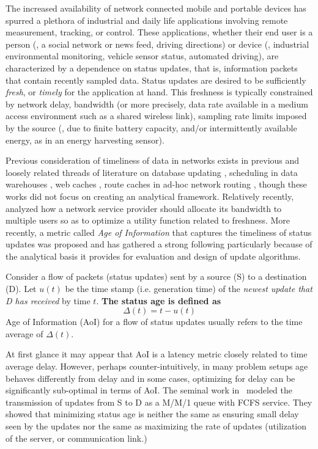 

The increased availability of network connected mobile and portable devices has spurred a plethora of industrial and daily life applications involving remote measurement, tracking, or control. These applications, whether their end user is a person (\eg, a social network or news feed, driving directions) or device (\eg, industrial environmental monitoring, vehicle sensor status, automated driving), are characterized by a dependence on status updates, that is, information packets that contain recently sampled data. Status updates are desired to be sufficiently \emph{fresh}, or \emph{timely} for the application at hand. This freshness is typically constrained by network delay, bandwidth (or more precisely, data rate available in a medium access environment such as a shared wireless link), sampling rate limits imposed by the source (\eg, due to finite battery capacity, and/or intermittently available energy, as in an energy harvesting sensor).

Previous consideration of timeliness of data in networks exists in previous and loosely related threads of literature on database updating \cite{Xiong99, adelberg1995applying, cho2000synchronizing}, scheduling in data warehouses \cite{golab2009scheduling}, web caches \cite{Shenker99}, route caches in ad-hoc network routing \cite{Johnson2002}, though these works did not focus on creating an analytical framework. Relatively recently, \cite{Stratis2009} analyzed how a network service provider should allocate its bandwidth to multiple users so as to optimize a utility function related to freshness. More recently, a metric called \emph{Age of Information} that captures the timeliness of status updates was proposed \cite{2011KaulGruteserRaiKenney, 2011Globecom-KaulYatesGruteser} and has gathered a strong following particularly because of the analytical basis it provides for evaluation and design of update algorithms.  

Consider a flow of packets (status updates) sent by a source (S) to a destination (D). Let $u (t)$ be the time stamp (i.e. generation time) of the \textit{newest update that D has received} by time $t$. \textbf{The status age is defined as} 
\[
\Delta (t) = t - u(t)
\]
Age of Information (AoI) for a flow of status updates usually refers to the time average of $\Delta(t)$. 

At first glance it may appear that AoI is a latency metric closely related to time average delay. However, perhaps counter-intuitively, in many problem setups age behaves differently from delay and in some cases, optimizing for delay can be significantly sub-optimal in terms of AoI. The seminal work in~\cite{KaulYatesGruteser-Infocom2012} modeled the transmission of updates from S to D as a M/M/1 queue with FCFS service. They showed that minimizing status age is neither the same as ensuring small delay seen by the updates nor the same as maximizing the rate of updates (utilization of the server, or communication link.)  


